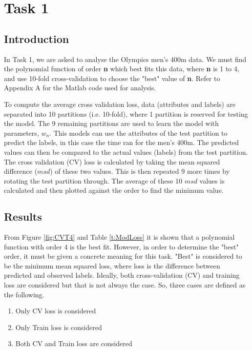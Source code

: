 \section{Task 1}{\label{s1}
	
\subsection{Introduction}\label{Int}
In Task 1, we are asked to analyse the Olympics men's 400m data. We must find the polynomial function of order \textbf{n} which best fits this data, where \textbf{n} is 1 to 4, and use 10-fold cross-validation to choose the "best" value of \textbf{n}. Refer to Appendix A for the Matlab code used for analysis.

To compute the average cross validation loss, data (attributes and labels) are separated into 10 partitions (i.e. 10-fold), where 1 partition is reserved for testing the model. The 9 remaining partitions are used to learn the model with parameters, $w_{n}$. This models can use the attributes of the test partition to predict the labels, in this case the time ran for the men's 400m. The predicted values can then be compared to the actual values (labels)  from the test partition. The cross validation (CV) loss is calculated by taking the mean squared difference ($msd$) of these two values. This is then repeated 9 more times by rotating the test partition through. The average of these 10 $msd$ values is calculated and then plotted against the order to find the minimum value.
\subsection{Results}\label{CVcons}
From Figure \ref{fig:CVT4} and Table \ref{t:ModLoss} it is shown that a polynomial function with order 4 is the best fit. However, in order to determine the "best" order, it must be given a concrete meaning for this task. "Best" is considered to be the minimum mean squared loss, where loss is the difference between predicted and observed labels. Ideally, both cross-validation (CV) and training loss are considered but that is not always the case. So, three cases are defined as the following.

\begin{enumerate}
	\item Only CV loss is considered
	\item Only Train loss is considered
	\item Both CV and Train loss are considered
\end{enumerate}

}
